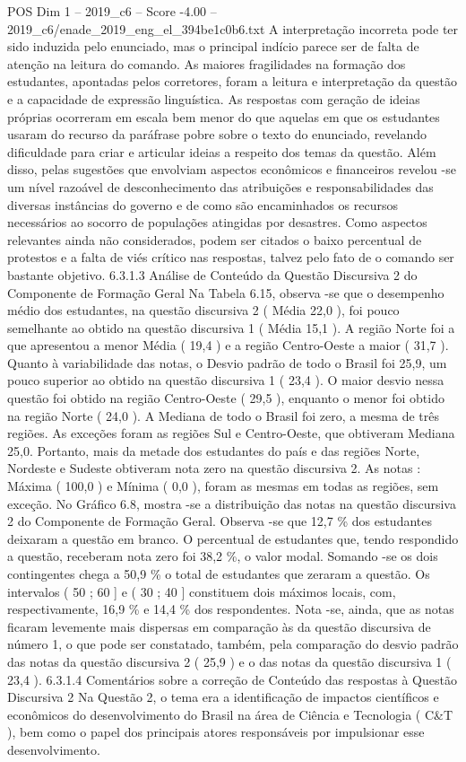 \begin{textsample}{POS Dim 1 – 2019\_c6 – Score -4.00 – 2019\_c6/enade\_2019\_eng\_el\_394be1c0b6.txt}
A interpretação incorreta pode ter sido induzida pelo enunciado, mas o principal indício parece ser de falta de atenção na leitura do comando.
As maiores fragilidades na formação dos estudantes, apontadas pelos corretores, foram a leitura e interpretação da questão e a capacidade de expressão linguística.
As respostas com geração de ideias próprias ocorreram em escala bem menor do que aquelas em que os estudantes usaram do recurso da paráfrase pobre sobre o texto do enunciado, revelando dificuldade para criar e articular ideias a respeito dos temas da questão.
Além disso, pelas sugestões que envolviam aspectos econômicos e financeiros revelou -se um nível razoável de desconhecimento das atribuições e responsabilidades das diversas instâncias do governo e de como são encaminhados os recursos necessários ao socorro de populações atingidas por desastres.
Como aspectos relevantes ainda não considerados, podem ser citados o baixo percentual de protestos e a falta de viés crítico nas respostas, talvez pelo fato de o comando ser bastante objetivo. 6.3.1.3 Análise de Conteúdo da Questão Discursiva 2 do Componente de Formação Geral Na Tabela 6.15, observa -se que o desempenho médio dos estudantes, na questão discursiva 2 ( Média 22,0 ), foi pouco semelhante ao obtido na questão discursiva 1 ( Média 15,1 ).
A região Norte foi a que apresentou a menor Média ( 19,4 ) e a região Centro-Oeste a maior ( 31,7 ).
Quanto à variabilidade das notas, o Desvio padrão de todo o Brasil foi 25,9, um pouco superior ao obtido na questão discursiva 1 ( 23,4 ).
O maior desvio nessa questão foi obtido na região Centro-Oeste ( 29,5 ), enquanto o menor foi obtido na região Norte ( 24,0 ).
A Mediana de todo o Brasil foi zero, a mesma de três regiões.
As exceções foram as regiões Sul e Centro-Oeste, que obtiveram Mediana 25,0.
Portanto, mais da metade dos estudantes do país e das regiões Norte, Nordeste e Sudeste obtiveram nota zero na questão discursiva 2.
As notas : Máxima ( 100,0 ) e Mínima ( 0,0 ), foram as mesmas em todas as regiões, sem exceção.
No Gráfico 6.8, mostra -se a distribuição das notas na questão discursiva 2 do Componente de Formação Geral.
Observa -se que 12,7 \% dos estudantes deixaram a questão em branco.
O percentual de estudantes que, tendo respondido a questão, receberam nota zero foi 38,2 \%, o valor modal.
Somando -se os dois contingentes chega a 50,9 \% o total de estudantes que zeraram a questão.
Os intervalos ( 50 ; 60 ] e ( 30 ; 40 ] constituem dois máximos locais, com, respectivamente, 16,9 \% e 14,4 \% dos respondentes.
Nota -se, ainda, que as notas ficaram levemente mais dispersas em comparação às da questão discursiva de número 1, o que pode ser constatado, também, pela comparação do desvio padrão das notas da questão discursiva 2 ( 25,9 ) e o das notas da questão discursiva 1 ( 23,4 ). 6.3.1.4 Comentários sobre a correção de Conteúdo das respostas à Questão Discursiva 2 Na Questão 2, o tema era a identificação de impactos científicos e econômicos do desenvolvimento do Brasil na área de Ciência e Tecnologia ( C\&T ), bem como o papel dos principais atores responsáveis por impulsionar esse desenvolvimento.

\end{textsample}
